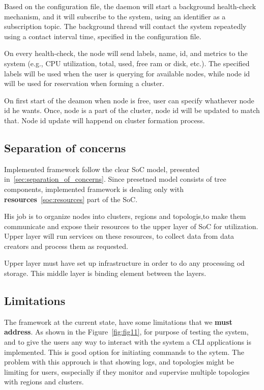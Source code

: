 Based on the configuration file, the daemon will start a background health-check mechanism, and it will subscribe to the system, using an identifier as a subscription topic. The background thread will contact the system repeatedly using a contact interval time, specified in the configuration file. 

On every health-check, the node will send labels, name, id, and metrics to the system (e.g., CPU utilization, total, used, free ram or disk, etc.). The specified labels will be used when the user is querying for available nodes, while node id will be used for reservation when forming a cluster.

On first start of the deamon when node is free, user can specify whathever node id he wants. Once, node is a part of the cluster, node id will be updated to match that. Node id update will happend on cluster formation process.
%
%
\subsection{Separation of concerns}\label{sec:framework_SoC}
%
Implemented framework follow the clear SoC model, presented in~\ref{sec:separation_of_concerns}. Since presetned model consists of tree components, implemented framework is dealing only with \textbf{resources}~\ref{soc:resources} part of the SoC. 

His job is to organize nodes into clusters, regions and topologis,to  make them communicate and expose their resources to the upper layer of SoC for utilization. Upper layer will run services on these resources, to collect data from data creators and process them as requested.

Upper layer must have set up infrastructure in order to do any processing od storage. This middle layer is binding element between the layers.
%
%
\subsection{Limitations}\label{sec:framework_limits}
% 
The framework at the current state, have some limitations that we \textbf{must address}. As shown in the Figure~\ref{fig:fig11}, for purpose of testing the system, and to give the users any way to interact with the system a CLI applications is implemented. This is good option for initiating commands to the sytem. The problem with this approuch is that showing logs, and topologies might be limiting for users, esspecially if they monitor and supervise multiple topologies with regions and clusters.

